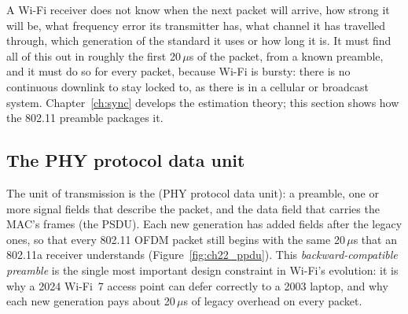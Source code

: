 A Wi-Fi receiver does not know when the next packet will arrive, how strong it will be, what
frequency error its transmitter has, what channel it has travelled through, which generation of
the standard it uses or how long it is. It must find all of this out in roughly the first
20\,$\mu$s of the packet, from a known preamble, and it must do so for every packet, because Wi-Fi
is bursty: there is no continuous downlink to stay locked to, as there is in a cellular or
broadcast system. Chapter~\ref{ch:sync} develops the estimation theory; this section shows how the
802.11 preamble packages it.

\subsection{The PHY protocol data unit}

The unit of transmission is the  (PHY protocol data unit): a preamble, one or more signal
fields that describe the packet, and the data field that carries the MAC's frames (the PSDU). Each
new generation has added fields after the legacy ones, so that every 802.11 OFDM packet still
begins with the same 20\,$\mu$s that an 802.11a receiver understands (Figure~\ref{fig:ch22_ppdu}).
This \emph{backward-compatible preamble} is the single most important design constraint in
Wi-Fi's evolution: it is why a 2024 Wi-Fi~7 access point can defer correctly to a 2003 laptop, and
why each new generation pays about 20\,$\mu$s of legacy overhead on every packet.

